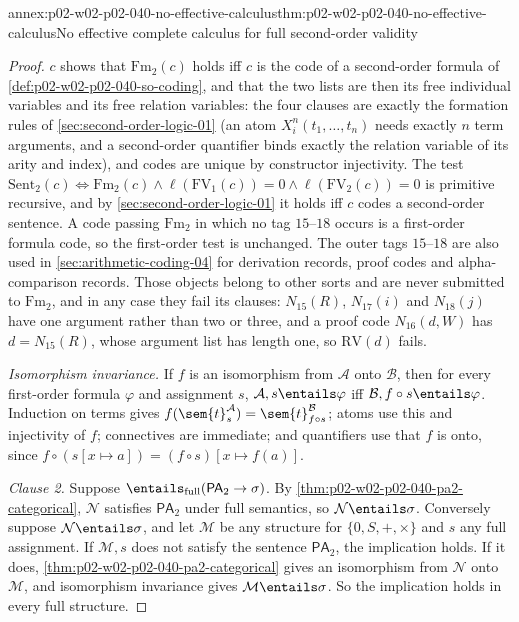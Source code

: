 \begin{annexitem}{annex:p02-w02-p02-040-no-effective-calculus}{thm:p02-w02-p02-040-no-effective-calculus}{No effective complete calculus for full second-order validity}
\begin{proof}
\(c\) shows that \(\mathrm{Fm}_2(c)\) holds iff \(c\) is the code of a
second-order formula of \cref{def:p02-w02-p02-040-so-coding}, and that the
two lists are then its free individual variables and its free relation
variables: the four clauses are exactly the formation rules of
\cref{sec:second-order-logic-01} (an atom \(X^n_i(t_1,\ldots,t_n)\) needs
exactly \(n\) term arguments, and a second-order quantifier binds exactly the
relation variable of its arity and index), and codes are unique by
constructor injectivity.  The test
\(\mathrm{Sent}_2(c)\iff\mathrm{Fm}_2(c)\wedge\ell(\mathrm{FV}_1(c))=0\wedge\ell(\mathrm{FV}_2(c))=0\)
is primitive recursive, and by \cref{sec:second-order-logic-01} it holds iff
\(c\) codes a second-order sentence.  A code passing \(\mathrm{Fm}_2\) in which no
tag \(15\)--\(18\) occurs is a first-order formula code, so the first-order
test is unchanged.  The outer tags \(15\)--\(18\) are also used in
\cref{sec:arithmetic-coding-04} for derivation records, proof codes and
alpha-comparison records.  Those objects belong to other sorts and are never
submitted to \(\mathrm{Fm}_2\), and in any case they fail its clauses:
\(N_{15}(R)\), \(N_{17}(i)\) and \(N_{18}(j)\) have one argument rather than two or
three, and a proof code \(N_{16}(d,W)\) has \(d=N_{15}(R)\), whose argument list
has length one, so \(\mathrm{RV}(d)\) fails.

\emph{Isomorphism invariance.}  If \(f\) is an isomorphism from
\(\mathcal A\) onto \(\mathcal B\), then for every first-order formula
\(\varphi\) and assignment \(s\), \(\mathcal A,s\entails\varphi\) iff
\(\mathcal B,f\circ s\entails\varphi\).  Induction on terms gives
\(f(\sem{t}^{\mathcal A}_s)=\sem{t}^{\mathcal B}_{f\circ s}\); atoms use this
and injectivity of \(f\); connectives are immediate; and quantifiers use
that \(f\) is onto, since \(f\circ(s[x\mapsto a])=(f\circ s)[x\mapsto f(a)]\).

\emph{Clause 2.}  Suppose \(\entails_{\mathrm{full}}(\mathsf{PA}_2\to\sigma)\).
By \cref{thm:p02-w02-p02-040-pa2-categorical}, \(\mathcal N\) satisfies
\(\mathsf{PA}_2\) under full semantics, so \(\mathcal N\entails\sigma\).
Conversely suppose \(\mathcal N\entails\sigma\), and let \(\mathcal M\) be any
structure for \(\{0,S,+,\times\}\) and \(s\) any full assignment.  If
\(\mathcal M,s\) does not satisfy the sentence \(\mathsf{PA}_2\), the
implication holds.  If it does, \cref{thm:p02-w02-p02-040-pa2-categorical}
gives an isomorphism from \(\mathcal N\) onto \(\mathcal M\), and isomorphism
invariance gives \(\mathcal M\entails\sigma\).  So the implication holds in
every full structure.


\end{proof}
\end{annexitem}
